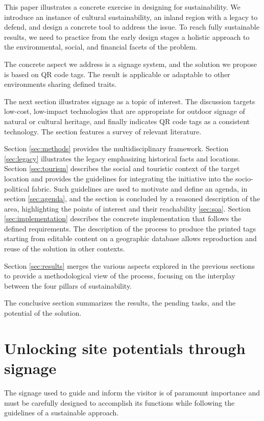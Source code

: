 \documentclass[sustainability,article,submit,pdftex,moreauthors]{Definitions/mdpi}
\begin{document}
This paper illustrates a concrete exercise in designing for sustainability. We introduce an instance of cultural sustainability, an inland region with a legacy to defend, and design a concrete tool to address the issue. To reach fully sustainable results, we need to practice from the early design stages a holistic approach to the environmental, social, and financial facets of the problem.

The concrete aspect we address is a signage system, and the solution we propose is based on QR code tags. The result is applicable or adaptable to other environments sharing defined traits.

The next section illustrates signage as a topic of interest. The discussion targets low-cost, low-impact technologies that are appropriate for outdoor signage of natural or cultural heritage, and finally indicates QR code tags as a consistent technology. The section features a survey of relevant literature.

Section \ref{sec:methods} provides the multidisciplinary framework. Section \ref{sec:legacy} illustrates the legacy emphasizing historical facts and locations. Section \ref{sec:tourism} describes the social and touristic context of the target location and provides the guidelines for integrating the initiative into the socio-political fabric. Such guidelines are used to motivate and define an agenda, in section \ref{sec:agenda}, and the section is concluded by a reasoned description of the area, highlighting the points of interest and their reachability \ref{sec:soa}. Section \ref{sec:implementation} describes the concrete implementation that follows the defined requirements. The description of the process to produce the printed tags starting from editable content on a geographic database allows reproduction and reuse of the solution in other contexts.

Section \ref{sec:results} merges the various aspects explored in the previous sections to provide a methodological view of the process, focusing on the interplay between the four pillars of sustainability.

The conclusive section summarizes the results, the pending tasks, and the potential of the solution. 

\section{Unlocking site potentials through signage \label{sec:signage}}

The signage used to guide and inform the visitor is of paramount importance and must be carefully designed to accomplish its functions while following the guidelines of a sustainable approach.
\end{document}
